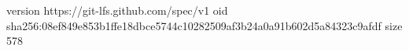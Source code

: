 version https://git-lfs.github.com/spec/v1
oid sha256:08ef849e853b1ffe18dbce5744c10282509af3b24a0a91b602d5a84323c9afdf
size 578
